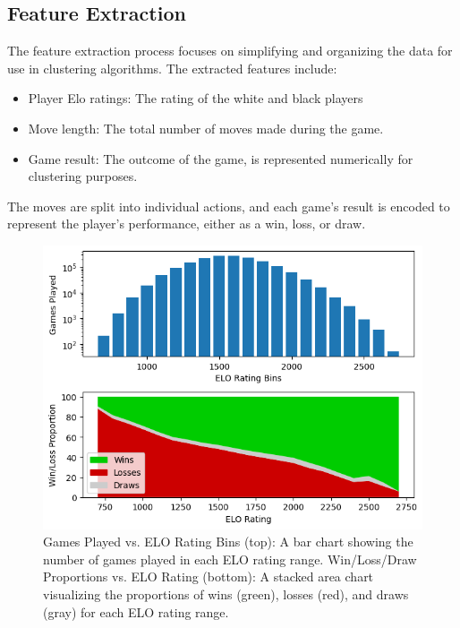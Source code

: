 \documentclass[conference]{IEEEtran}
\begin{document}
\subsection{Feature Extraction}

The feature extraction process focuses on simplifying and organizing the data for use in clustering algorithms. The extracted features include:
\begin{itemize}
    \item Player Elo ratings: The rating of the white and black players
    \item Move length: The total number of moves made during the game.
    \item Game result: The outcome of the game, is represented numerically for clustering purposes.
\end{itemize}
The moves are split into individual actions, and each game's result is encoded to represent the player's performance, either as a win, loss, or draw.

\begin{figure}[htbp]
\centerline{\includegraphics[scale=0.5]{Distribution and Win-Loss Proportion by ELO.png}}
\caption{Games Played vs. ELO Rating Bins (top): A bar chart showing the number of games played in each ELO rating range.
Win/Loss/Draw Proportions vs. ELO Rating (bottom): A stacked area chart visualizing the proportions of wins (green), losses (red), and draws (gray) for each ELO rating range.}
\label{fig}
\end{figure}
\end{document}
